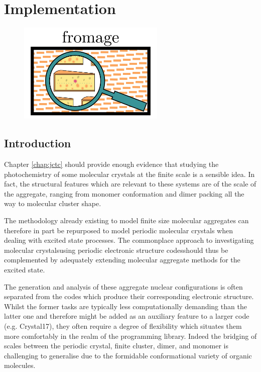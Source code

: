 \chapter{Implementation}
\label{chap:prog}
\begin{figure}[ht]
\centering
\includegraphics[width=7cm]{Chapters/6Implementation/toc.pdf}
\end{figure}



\section{Introduction}

Chapter \ref{chap:jctc} should provide enough evidence that studying the photochemistry of some molecular crystals at the finite scale is a sensible idea. In fact, the structural features which are relevant to these systems are of the scale of the aggregate, ranging from monomer conformation and dimer packing all the way to molecular cluster shape.

The methodology already existing to model finite size molecular aggregates can therefore in part be repurposed to model periodic molecular crystals when dealing with excited state processes. The commonplace approach to investigating molecular crystals\textemdash{}using periodic electronic structure codes\textemdash{}should thus be complemented by adequately extending molecular aggregate methods for the excited state.

The generation and analysis of these aggregate nuclear configurations is often separated from the codes which produce their corresponding electronic structure. Whilst the former tasks are typically less computationally demanding than the latter one and therefore might be added as an auxiliary feature to a larger code (e.g. Crystal17\cite{Dovesi2018}), they often require a degree of flexibility which situates them more comfortably in the realm of the programming library. Indeed the bridging of scales between the periodic crystal, finite cluster, dimer, and monomer is challenging to generalise due to the formidable conformational variety of organic molecules.

